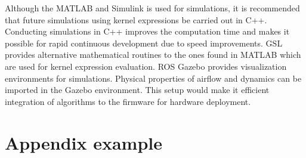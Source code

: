 \documentclass[letterpaper%
, twoside%
, 12pt%
,memoire%
, english%
,creativecommons,hyperref%
]{thETS}
\begin{document}
\begin{conclusion}
Although the MATLAB and Simulink is used for simulations, it is recommended that future simulations using kernel expressions be carried out in C++. Conducting simulations in C++ improves the computation time and makes it possible for rapid continuous development due to speed improvements. GSL provides alternative mathematical routines to the ones found in MATLAB which are used for kernel expression evaluation. ROS Gazebo provides visualization environments for simulations. Physical properties of airflow and dynamics can be imported in the Gazebo environment. This setup would make it efficient integration of algorithms to the firmware for hardware deployment. 

\end{conclusion}



\appendix

\multiannexe

% 

\chapter{Appendix example}
\end{document}
